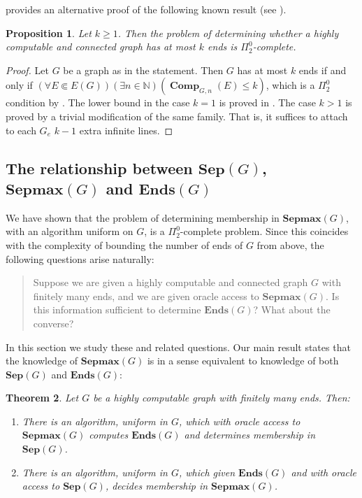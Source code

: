 \documentclass[10pt,A4]{amsart}
\newtheorem{thm}{Theorem}[section]
\newtheorem{prop}[thm]{Proposition}
\theoremstyle{definition}
\theoremstyle{definition}
\newcommand{\N}{\mathbb{N}}
\newcommand{\sep}[1]{\mathbf{Sep}({#1})}
\newcommand{\Ends}[1]{\mathbf{Ends}({#1})}
\newcommand{\sepmax}[1]{\mathbf{Sepmax}({#1})}
\newcommand{\comp}{\operatorname{\mathbf{Comp}}}
\begin{document}
 provides an alternative proof of the following known result (see \cite{Kuske-Lohrey}).
\begin{prop}
    Let $k\geq 1$. Then the problem of determining whether a highly computable and connected graph has at most $k$ ends is $\Pi^0_2$-complete.
\end{prop}
\begin{proof}
    Let $G$ be a graph as in the statement. Then $G$ has at most $k$ ends if and only if $(\forall E\Subset E(G))(\exists n\in\N)(\comp_{G,n}(E)\leq k)$, which is a $\Pi_2^0$ condition by . The lower bound in the case $k=1$ is proved in . The case $k> 1$ is proved by a trivial modification of the same family. That is, it suffices to attach to each $G_e$ $k-1$ extra infinite lines. 
\end{proof}




\subsection{The relationship between $\sep{G}$, $\sepmax{G}$ and  $\Ends{G}$}
We have shown that the problem of determining membership in $\sepmax{G}$, with an algorithm uniform on $G$, is a $\Pi_2^0$-complete problem. Since this coincides with the complexity of bounding the number of ends of $G$ from above, the following questions arise naturally:
\begin{quote}
    Suppose we are given a highly computable and connected graph $G$ with finitely many ends, and we are given oracle access to $\sepmax{G}$. Is this information sufficient to determine  $\Ends{G}$? What about the converse?
\end{quote}
In this section we study these and related questions. Our main result states that the knowledge of $\sepmax{G}$ is in a sense equivalent to knowledge of both $\sep{G}$ and $\Ends{G}$:
\begin{thm}\label{ends+sep=sepmax}
    Let $G$ be a highly computable graph with finitely many ends. Then:
    \begin{enumerate}
        \item There is an algorithm, uniform in $G$, which with oracle access to $\sepmax{G}$ computes $\Ends{G}$ and determines membership in $\sep{G}$.
        \item There is an algorithm, uniform in $G$, which given $\Ends{G}$ and with oracle access to $\sep{G}$, decides membership in $\sepmax{G}$. 
    \end{enumerate}
\end{thm}
\end{document}
